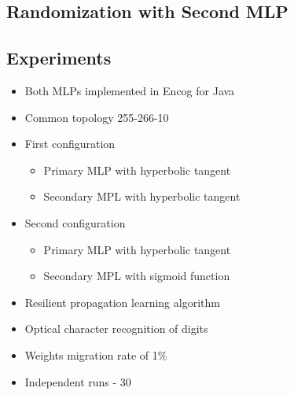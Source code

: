 \documentclass[a0,portrait,25pt]{sciposter}
\begin{document}
\begin{multicols}{3}
\begin{mdframed}[backgroundcolor=white,roundcorner=4pt,shadow=true,linewidth=1pt]
\color{Black}
\section*{Randomization with Second MLP}
\end{mdframed}

\begin{mdframed}[backgroundcolor=white,roundcorner=4pt,shadow=true,linewidth=1pt]
\color{Black}
\section*{Experiments}
\begin{itemize}
\item Both MLPs implemented in Encog for Java
\item Common topology 255-266-10
\item First configuration
\begin{itemize}
  \item Primary MLP with hyperbolic tangent
  \item Secondary MPL with hyperbolic tangent
\end{itemize}
\item Second configuration
\begin{itemize}
  \item Primary MLP with hyperbolic tangent
  \item Secondary MPL with sigmoid function
\end{itemize}
\item Resilient propagation learning algorithm
\item Optical character recognition of digits
\item Weights migration rate of 1\%
\item Independent runs - 30
\end{itemize}
\end{mdframed}

\begin{mdframed}[backgroundcolor=white,roundcorner=4pt,shadow=true,linewidth=1pt]
\color{Black}

\end{mdframed}
\end{multicols}
\end{document}
